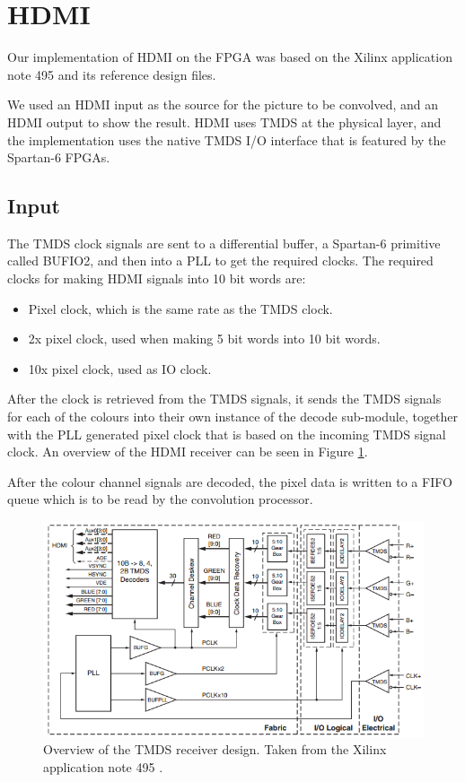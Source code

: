 \section{HDMI}
Our implementation of HDMI on the FPGA was based on the Xilinx application note 495 \cite{xapp495} and its reference design files.

We used an HDMI input as the source for the picture to be convolved, and an HDMI output to show the result.
HDMI uses TMDS at the physical layer, and the implementation uses the native TMDS I/O interface that is featured by the Spartan-6 FPGAs.

\subsection{Input}
The TMDS clock signals are sent to a differential buffer, a Spartan-6 primitive called BUFIO2, and then into a PLL to get the required clocks. The required clocks for making HDMI signals into 10 bit words are:
\begin{itemize}
    \item   Pixel clock, which is the same rate as the TMDS clock.
    \item   2x pixel clock, used when making 5 bit words into 10 bit words.
    \item   10x pixel clock, used as IO clock.
\end{itemize}

After the clock is retrieved from the TMDS signals, it sends the TMDS signals for each of the colours into their own instance of the decode sub-module, together with the PLL generated pixel clock that is based on the incoming TMDS signal clock.
An overview of the HDMI receiver can be seen in Figure \ref{fig:TMDSReceiver}.

After the colour channel signals are decoded, the pixel data is written to a FIFO queue which is to be read by the convolution processor.

\begin{figure}[h!]
    \centering
    \includegraphics[width=\linewidth]{img/TMDSreceiverdesign.png}
    \caption[Overview of the TMDS receiver design.]{Overview of the TMDS receiver design. Taken from the Xilinx application note 495 \cite{xapp495}.}
    \label{fig:TMDSReceiver}
\end{figure}


